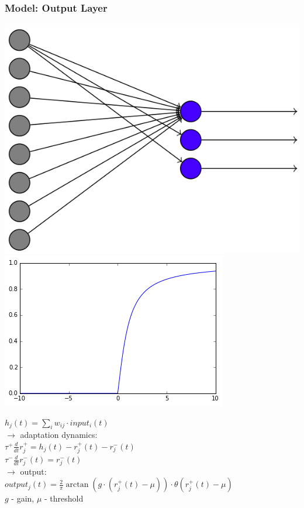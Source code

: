 \begin{frame}
\frametitle{Model: Output Layer}
\begin{multicols}{2}
\begin{center}
\includegraphics[scale=.1]{pics/model_output}
\vskip 3mm
\includegraphics[scale=.3]{pics/output_function}
\end{center}
\columnbreak
\begin{center}
$h_j(t) = \sum_i w_{ij} \cdot input_i(t)$\\
\vskip 6mm
$\rightarrow$ adaptation dynamics:\\
\vskip 3mm
$\tau^+\frac{d}{dt}r^+_j=h_j(t)-r^+_j(t)-r^-_j(t)$\\
\vskip 3mm
$\tau^-\frac{d}{dt}r^-_j(t)=r^-_j(t)$\\
\vskip 3mm
$\rightarrow$ output:\\
\vskip 3mm
$output_j(t)=\frac{2}{\pi} \arctan (g \cdot (r^+_j(t)-\mu)) \cdot \theta(r_j^+(t)-\mu)$\\
\vskip 3mm
$g$ - gain, $\mu$ - threshold
\end{center}
\end{multicols}
\end{frame}

